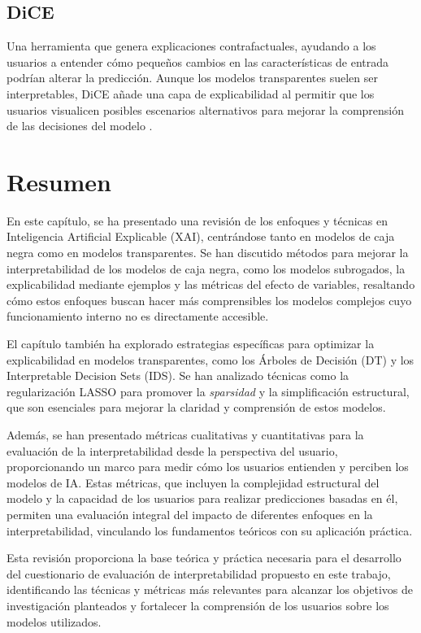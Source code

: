 \subsection{DiCE}
Una herramienta que genera explicaciones contrafactuales, ayudando a los usuarios a entender cómo pequeños cambios en las características de entrada podrían alterar la predicción. Aunque los modelos transparentes suelen ser interpretables, DiCE añade una capa de explicabilidad al permitir que los usuarios visualicen posibles escenarios alternativos para mejorar la comprensión de las decisiones del modelo \cite{arya2019one}.

\section{Resumen}

En este capítulo, se ha presentado una revisión de los enfoques y técnicas en Inteligencia Artificial Explicable (XAI), centrándose tanto en modelos de caja negra como en modelos transparentes. Se han discutido métodos para mejorar la interpretabilidad de los modelos de caja negra, como los modelos subrogados, la explicabilidad mediante ejemplos y las métricas del efecto de variables, resaltando cómo estos enfoques buscan hacer más comprensibles los modelos complejos cuyo funcionamiento interno no es directamente accesible.

El capítulo también ha explorado estrategias específicas para optimizar la explicabilidad en modelos transparentes, como los Árboles de Decisión (DT) y los Interpretable Decision Sets (IDS). Se han analizado técnicas como la regularización LASSO para promover la \textit{sparsidad} y la simplificación estructural, que son esenciales para mejorar la claridad y comprensión de estos modelos.

Además, se han presentado métricas cualitativas y cuantitativas para la evaluación de la interpretabilidad desde la perspectiva del usuario, proporcionando un marco para medir cómo los usuarios entienden y perciben los modelos de IA. Estas métricas, que incluyen la complejidad estructural del modelo y la capacidad de los usuarios para realizar predicciones basadas en él, permiten una evaluación integral del impacto de diferentes enfoques en la interpretabilidad, vinculando los fundamentos teóricos con su aplicación práctica.

Esta revisión proporciona la base teórica y práctica necesaria para el desarrollo del cuestionario de evaluación de interpretabilidad propuesto en este trabajo, identificando las técnicas y métricas más relevantes para alcanzar los objetivos de investigación planteados y fortalecer la comprensión de los usuarios sobre los modelos utilizados.


